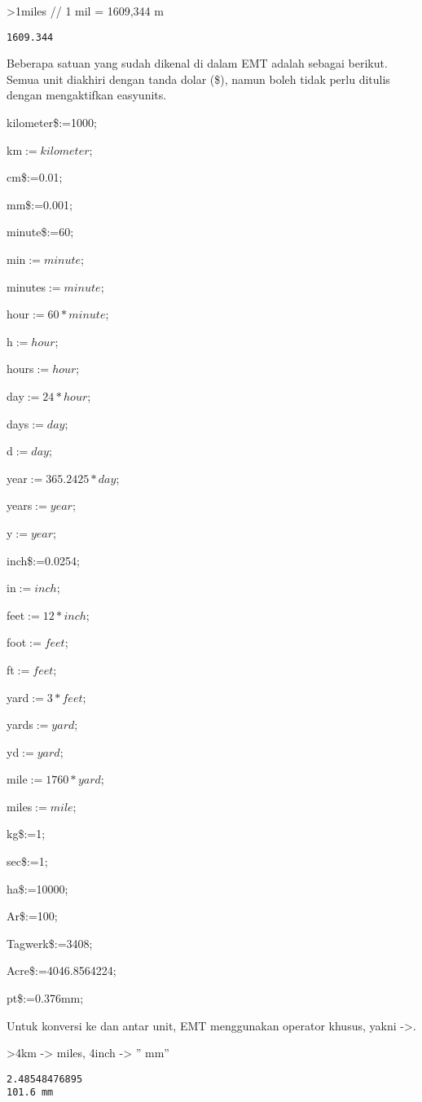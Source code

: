 \documentclass[
]{book}
\begin{document}
\textgreater1miles // 1 mil = 1609,344 m

\begin{verbatim}
1609.344
\end{verbatim}

Beberapa satuan yang sudah dikenal di dalam EMT adalah sebagai berikut. Semua unit diakhiri dengan tanda dolar (\$), namun boleh tidak perlu ditulis dengan mengaktifkan easyunits.

kilometer\$:=1000;

km\(:=kilometer\);

cm\$:=0.01;

mm\$:=0.001;

minute\$:=60;

min\(:=minute\);

minutes\(:=minute\);

hour\(:=60*minute\);

h\(:=hour\);

hours\(:=hour\);

day\(:=24*hour\);

days\(:=day\);

d\(:=day\);

year\(:=365.2425*day\);

years\(:=year\);

y\(:=year\);

inch\$:=0.0254;

in\(:=inch\);

feet\(:=12*inch\);

foot\(:=feet\);

ft\(:=feet\);

yard\(:=3*feet\);

yards\(:=yard\);

yd\(:=yard\);

mile\(:=1760*yard\);

miles\(:=mile\);

kg\$:=1;

sec\$:=1;

ha\$:=10000;

Ar\$:=100;

Tagwerk\$:=3408;

Acre\$:=4046.8564224;

pt\$:=0.376mm;

Untuk konversi ke dan antar unit, EMT menggunakan operator khusus, yakni -\textgreater.

\textgreater4km -\textgreater{} miles, 4inch -\textgreater{} '' mm''

\begin{verbatim}
2.48548476895
101.6 mm
\end{verbatim}
\end{document}
